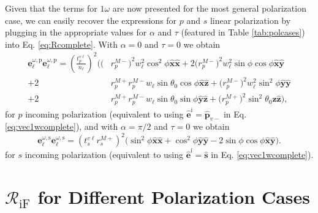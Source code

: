 \documentclass[aps,pra,10pt,amsmath,notitlepage,letterpaper]{revtex4-1}
\begin{document}
Given that the terms for $1\omega$ are now presented for the most general
polarization case, we can easily recover the expressions for $p$ and $s$ linear
polarization by plugging in the appropriate values for $\alpha$ and $\tau$
(featured in Table \ref{tab:polcases}) into Eq. \eqref{eq:Rcomplete}. With
$\alpha = 0$ and $\tau = 0$ we obtain
\begin{equation}\label{eq:ewewpmr}
\begin{split}
\mathbf{e}^{\omega,\mathrm{p}}_{\ell}\mathbf{e}^{\omega,\mathrm{p}}_{\ell} =
\left(\frac{t^{v\ell}_{p}}{n_{\ell}}\right)^{2}
\bigg(
  \big(&r^{M-}_{p}\big)^{2}w^{2}_{\ell}\cos^{2}\phi
  \hat{\mathbf{x}}\hat{\mathbf{x}}
+ 2\big(r^{M-}_{p}\big)^{2}w^{2}_{\ell}\sin\phi\cos\phi
  \hat{\mathbf{x}}\hat{\mathbf{y}}\\
+ 2&r^{M+}_{p}r^{M-}_{p}w_{\ell}\sin\theta_{0}\cos\phi
  \hat{\mathbf{x}}\hat{\mathbf{z}}
+ \big(r^{M-}_{p}\big)^{2}w^{2}_{\ell}\sin^{2}\phi
  \hat{\mathbf{y}}\hat{\mathbf{y}}\\
+ 2&r^{M+}_{p}r^{M-}_{p}w_{\ell}\sin\theta_{0}\sin\phi
  \hat{\mathbf{y}}\hat{\mathbf{z}}
+ \big(r^{M+}_{p}\big)^{2}\sin^{2}\theta_{0}
   \hat{\mathbf{z}}\hat{\mathbf{z}}
\bigg),
\end{split}
\end{equation}
for $p$ incoming polarization (equivalent to using
$\hat{\mathbf{e}}^{\mathrm{i}} = \hat{\mathbf{p}}_{v-}$ in Eq.
\eqref{eq:vec1wcomplete}), and with $\alpha = \pi/2$ and $\tau = 0$ we obtain
\begin{equation}\label{eq:ewewsmr}
\mathbf{e}^{\omega,\mathrm{s}}_{\ell}\mathbf{e}^{\omega,\mathrm{s}}_{\ell}
= \left(t^{v\ell}_{s}r^{M+}_{s}\right)^{2}
\big(
  \sin^{2}\phi\hat{\mathbf{x}}\hat{\mathbf{x}}
 + \cos^{2}\phi\hat{\mathbf{y}}\hat{\mathbf{y}}
 - 2\sin\phi\cos\phi\hat{\mathbf{x}}\hat{\mathbf{y}}
\big).
\end{equation}
for $s$ incoming polarization (equivalent to using
$\hat{\mathbf{e}}^{\mathrm{i}} = \hat{\mathbf{s}}$ in Eq.
\eqref{eq:vec1wcomplete}).



\section{\texorpdfstring{$\mathcal{R}_{\mathrm{iF}}$}{R} for Different
Polarization Cases}\label{sec:rcases}
\end{document}
